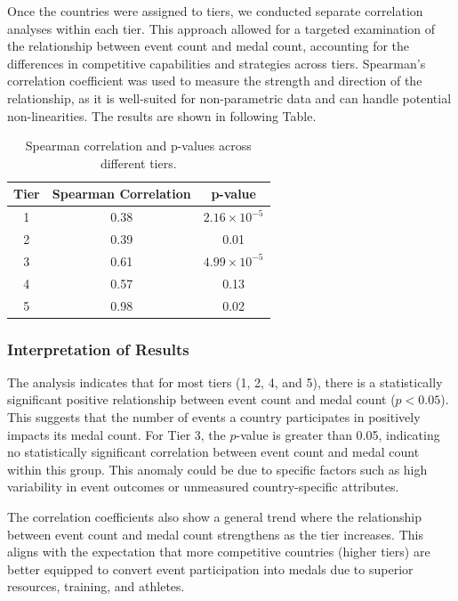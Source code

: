\documentclass{mcmthesis}
\begin{document}
    Once the countries were assigned to tiers, we conducted separate correlation analyses within each tier. This approach allowed for a targeted examination of the relationship between event count and medal count, accounting for the differences in competitive capabilities and strategies across tiers. Spearman's correlation coefficient was used to measure the strength and direction of the relationship, as it is well-suited for non-parametric data and can handle potential non-linearities. The results are shown in following Table.


\begin{table}[h!]
    \centering
    \begin{tabular}{ccc}
    \toprule
    \textbf{Tier} & \textbf{Spearman Correlation} & \textbf{p-value} \\
    \midrule
    1 & 0.38 & $2.16 \times 10^{-5}$ \\
    2 & 0.39 & 0.01 \\
    3 & 0.61 & $4.99 \times 10^{-5}$ \\
    4 & 0.57 & 0.13 \\
    5 & 0.98 & 0.02 \\
    \bottomrule
    \end{tabular}
    \caption{Spearman correlation and p-values across different tiers.}
    \label{tab1}
\end{table}

\subsubsection{Interpretation of Results}
The analysis indicates that for most tiers (1, 2, 4, and 5), there is a statistically significant positive relationship between event count and medal count ($p < 0.05$). This suggests that the number of events a country participates in positively impacts its medal count. For Tier 3, the $p$-value is greater than 0.05, indicating no statistically significant correlation between event count and medal count within this group. This anomaly could be due to specific factors such as high variability in event outcomes or unmeasured country-specific attributes.

The correlation coefficients also show a general trend where the relationship between event count and medal count strengthens as the tier increases. This aligns with the expectation that more competitive countries (higher tiers) are better equipped to convert event participation into medals due to superior resources, training, and athletes.
\end{document}
